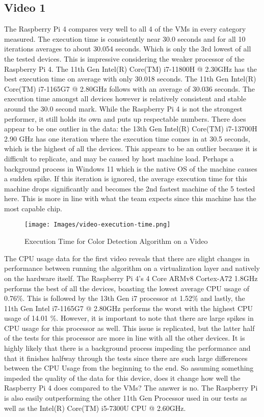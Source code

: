 \subsection{Video 1}

The Raspberry Pi 4 compares very well to all 4 of the VMs in every
category measured. The execution time is consistently near 30.0
seconds and for all 10 iterations averages to about 30.054 seconds.
Which is only the 3rd lowest of all the tested devices. This is
impressive considering the weaker processor of the Raspberry Pi 4. The
11th Gen Intel(R) Core(TM) i7-11800H @ 2.30GHz has the best execution
time on average with only 30.018 seconds. The 11th Gen Intel(R) Core(TM)
i7-1165G7 @ 2.80GHz follows with an average of 30.036 seconds. The
execution time amongst all devices however is relatively consistent and
stable around the 30.0 second mark. While the Raspberry Pi 4 is not the
strongest performer, it still holds its own and puts up respectable
numbers. There does appear to be one outlier in the data: the 13th Gen
Intel(R) Core(TM) i7-13700H 2.90 GHz has one iteration where the
execution time comes in at 30.5 seconds, which is the highest of all the
devices. This appears to be an outlier because it is difficult to
replicate, and may be caused by host machine load. Perhaps a
background process in Windows 11 which is the native OS of the machine
causes a sudden spike. If this iteration is ignored, the average
execution time for this machine drops significantly and becomes the 2nd
fastest machine of the 5 tested here. This is more in line with what the
team expects since this machine has the most capable chip.

\begin{figure}
    \centering
    \texttt{[image: Images/video-execution-time.png]}
    \caption{Execution Time for Color Detection Algorithm on a Video}
\end{figure}

The CPU usage data for the first video reveals that there are slight
changes in performance between running the algorithm on a virtualization
layer and natively on the hardware itself. The Raspberry Pi 4's 4 Core
ARMv8 Cortex-A72 1.8GHz performs the best of all the devices,
boasting the lowest average CPU usage of 0.76\%. This is followed by
the 13th Gen i7 processor at 1.52\% and lastly, the 11th Gen Intel
i7-1165G7 @ 2.80GHz performs the worst with the highest CPU usage of
14.01 \%. However, it is important to note that there are large spikes
in CPU usage for this processor as well. This issue is replicated, but
the latter half of the tests for this processor are more in line with
all the other devices. It is highly likely that there is a background
process impeding the performance and that it finishes halfway through
the tests since there are such large differences between the CPU Usage
from the beginning to the end. So assuming something impeded the quality
of the data for this device, does it change how well the Raspberry Pi 4
does compared to the VMs? The answer is no. The Raspberry Pi is also
easily outperforming the other 11th Gen Processor used in our tests as
well as the Intel(R) Core(TM) i5-7300U CPU @ 2.60GHz.

